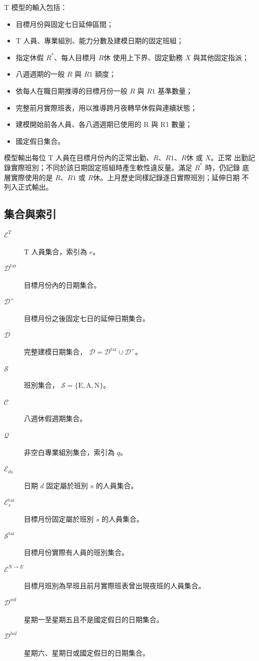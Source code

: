 \documentclass[a4paper,12pt]{article}
\begin{document}
T 模型的輸入包括：
\begin{itemize}
  \item 目標月份與固定七日延伸區間；
  \item T 人員、專業組別、能力分數及建模日期的固定班組；
  \item 指定休假 \(R^*\)、每人目標月 \(R休\) 使用上下界、固定勤務 \(X\) 與其他固定指派；
  \item 八週週期的一般 \(R\) 與 \(R1\) 額度；
  \item 依每人在職日期推導的目標月份一般 \(R\) 與 \(R1\) 基準數量；
  \item 完整前月實際班表，用以推導跨月夜轉早休假與連續狀態；
  \item 建模開始前各人員、各八週週期已使用的 R 與 R1 數量；
  \item 國定假日集合。
\end{itemize}

模型輸出每位 T 人員在目標月份內的正常出勤、\(R\)、\(R1\)、\(R休\) 或 \(X\)。正常
出勤記錄實際班別；不同於該日期固定班組時產生軟性違反量。滿足 \(R^*\) 時，仍記錄
底層實際使用的是 \(R\)、\(R1\) 或 \(R休\)。上月歷史同樣記錄逐日實際班別；延伸日期
不列入正式輸出。

\subsection{集合與索引}

\begin{description}
  \item[\(\mathcal{E}^{T}\)] T 人員集合，索引為 \(e\)。
  \item[\(\mathcal{D}^{\mathrm{tar}}\)] 目標月份內的日期集合。
  \item[\(\mathcal{D}^{+}\)] 目標月份之後固定七日的延伸日期集合。
  \item[\(\mathcal{D}\)] 完整建模日期集合，
    \(\mathcal{D}=\mathcal{D}^{\mathrm{tar}}\cup\mathcal{D}^{+}\)。
  \item[\(\mathcal{S}\)] 班別集合，
    \(\mathcal{S}=\{\mathrm{E},\mathrm{A},\mathrm{N}\}\)。
  \item[\(\mathcal{C}\)] 八週休假週期集合。
  \item[\(\mathcal{Q}\)] 非空白專業組別集合，索引為 \(q\)。
  \item[\(\mathcal{E}_{ds}\)] 日期 \(d\) 固定屬於班別 \(s\) 的人員集合。
  \item[\(\mathcal{E}^{\mathrm{tar}}_s\)] 目標月份固定屬於班別 \(s\) 的人員集合。
  \item[\(\mathcal{S}^{\mathrm{tar}}\)] 目標月份實際有人員的班別集合。
  \item[\(\mathcal{E}^{N\rightarrow E}\)] 目標月班別為早班且前月實際班表曾出現夜班的人員集合。
  \item[\(\mathcal{D}^{wd}\)] 星期一至星期五且不是國定假日的日期集合。
  \item[\(\mathcal{D}^{hol}\)] 星期六、星期日或國定假日的日期集合。
\end{description}
\end{document}
